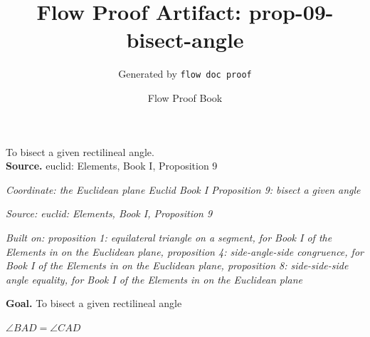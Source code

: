 \documentclass[11pt]{article}
\title{Flow Proof Artifact: prop-09-bisect-angle}
\author{Generated by \texttt{flow doc proof}}
\date{Flow Proof Book}
\theoremstyle{definition}
\begin{document}
\maketitle
To bisect a given rectilineal angle.\\[0.5em]
\textbf{Source.} euclid: Elements, Book I, Proposition 9\\[0.5em]
\bigskip
{}\par
\smallskip\noindent\textit{Coordinate: the Euclidean plane \cdot Euclid Book I \cdot Proposition 9: bisect a given angle}\par
\smallskip\noindent\textit{Source: euclid: Elements, Book I, Proposition 9}\par
\smallskip\noindent\textit{Built on: proposition 1: equilateral triangle on a segment, for Book I of the Elements in on the Euclidean plane, proposition 4: side-angle-side congruence, for Book I of the Elements in on the Euclidean plane, proposition 8: side-side-side angle equality, for Book I of the Elements in on the Euclidean plane}\par
\medskip
\noindent\textbf{Goal.} To bisect a given rectilineal angle\par
\noindent$\displaystyle \angle BAD = \angle CAD$\par
\medskip
\noindent
\end{document}
